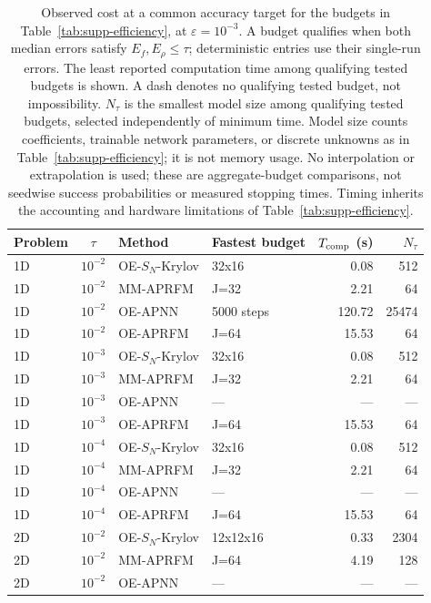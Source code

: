 \begin{table}[t]
\centering
\caption{Observed cost at a common accuracy target for the budgets in Table~\ref{tab:supp-efficiency}, at $\varepsilon=10^{-3}$. A budget qualifies when both median errors satisfy $E_f,E_\rho\leq\tau$; deterministic entries use their single-run errors. The least reported computation time among qualifying tested budgets is shown. A dash denotes no qualifying tested budget, not impossibility. $N_\tau$ is the smallest model size among qualifying tested budgets, selected independently of minimum time. Model size counts coefficients, trainable network parameters, or discrete unknowns as in Table~\ref{tab:supp-efficiency}; it is not memory usage. No interpolation or extrapolation is used; these are aggregate-budget comparisons, not seedwise success probabilities or measured stopping times. Timing inherits the accounting and hardware limitations of Table~\ref{tab:supp-efficiency}.}
\label{tab:supp-target-accuracy}
\begin{tabular}{lcllrr}
\toprule
Problem & $\tau$ & Method & Fastest budget & $T_{\rm comp}$ (s) & $N_\tau$\\
\midrule
1D & $10^{-2}$ & OE-$S_N$-Krylov & 32x16 & 0.08 & 512\\
1D & $10^{-2}$ & MM-APRFM & J=32 & 2.21 & 64\\
1D & $10^{-2}$ & OE-APNN & 5000 steps & 120.72 & 25474\\
1D & $10^{-2}$ & OE-APRFM & J=64 & 15.53 & 64\\
\addlinespace
1D & $10^{-3}$ & OE-$S_N$-Krylov & 32x16 & 0.08 & 512\\
1D & $10^{-3}$ & MM-APRFM & J=32 & 2.21 & 64\\
1D & $10^{-3}$ & OE-APNN & --- & --- & ---\\
1D & $10^{-3}$ & OE-APRFM & J=64 & 15.53 & 64\\
\addlinespace
1D & $10^{-4}$ & OE-$S_N$-Krylov & 32x16 & 0.08 & 512\\
1D & $10^{-4}$ & MM-APRFM & J=32 & 2.21 & 64\\
1D & $10^{-4}$ & OE-APNN & --- & --- & ---\\
1D & $10^{-4}$ & OE-APRFM & J=64 & 15.53 & 64\\
\addlinespace
2D & $10^{-2}$ & OE-$S_N$-Krylov & 12x12x16 & 0.33 & 2304\\
2D & $10^{-2}$ & MM-APRFM & J=64 & 4.19 & 128\\
2D & $10^{-2}$ & OE-APNN & --- & --- & ---\\

\end{tabular}
\end{table}
